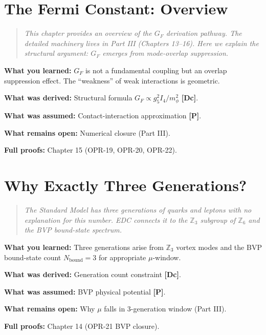 \documentclass[11pt,a4paper]{book}
\theoremstyle{definition}
\theoremstyle{remark}
\newcommand{\tagDc}{\textcolor{calibratedColor}{\textbf{[Dc]}}}
\newcommand{\tagP}{\textcolor{postulatedColor}{\textbf{[P]}}}
\begin{document}
\chapter{The Fermi Constant: Overview}
\label{ch:gf_overview}

\begin{quote}
\textit{This chapter provides an overview of the $G_F$ derivation pathway.
The detailed machinery lives in Part III (Chapters 13--16). Here we explain
the structural argument: $G_F$ emerges from mode-overlap suppression.}
\end{quote}



\begin{chapterRecap}
\textbf{What you learned:} $G_F$ is not a fundamental coupling but an overlap
suppression effect. The ``weakness'' of weak interactions is geometric.

\textbf{What was derived:} Structural formula $G_F \propto g_5^2 I_4 / m_\phi^2$ \tagDc{}.

\textbf{What was assumed:} Contact-interaction approximation \tagP{}.

\textbf{What remains open:} Numerical closure (Part III).

\textbf{Full proofs:} Chapter 15 (OPR-19, OPR-20, OPR-22).
\end{chapterRecap}

\chapter{Why Exactly Three Generations?}
\label{ch:three_generations}

\begin{quote}
\textit{The Standard Model has three generations of quarks and leptons with no
explanation for this number. EDC connects it to the $\mathbb{Z}_3$ subgroup of
$\mathbb{Z}_6$ and the BVP bound-state spectrum.}
\end{quote}



\begin{chapterRecap}
\textbf{What you learned:} Three generations arise from $\mathbb{Z}_3$ vortex modes
and the BVP bound-state count $N_{\text{bound}} = 3$ for appropriate $\mu$-window.

\textbf{What was derived:} Generation count constraint \tagDc{}.

\textbf{What was assumed:} BVP physical potential \tagP{}.

\textbf{What remains open:} Why $\mu$ falls in 3-generation window (Part III).

\textbf{Full proofs:} Chapter 14 (OPR-21 BVP closure).
\end{chapterRecap}
\end{document}
